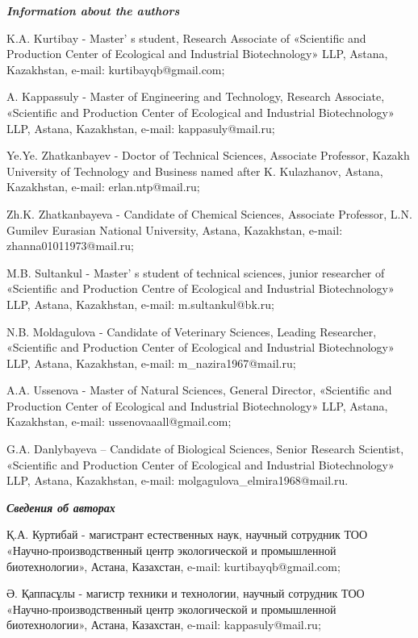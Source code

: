 \begin{authorinfo}
\hspace{1em}\emph{{\bfseries Information about the authors}}

K.A. Kurtibay - Master' s student, Research Associate of
«Scientific and Production Center of Ecological and Industrial
Biotechnology» LLP, Astana, Kazakhstan, e-mail: kurtibayqb@gmail.com;

A. Kappassuly - Master of Engineering and Technology, Research
Associate, «Scientific and Production Center of Ecological and
Industrial Biotechnology» LLP, Astana, Kazakhstan, e-mail:
kappasuly@mail.ru;

Ye.Ye. Zhatkanbayev - Doctor of Technical Sciences, Associate Professor,
Kazakh University of Technology and Business named after K. Kulazhanov,
Astana, Kazakhstan, e-mail: erlan.ntp@mail.ru;

Zh.K. Zhatkanbayeva - Candidate of Chemical Sciences, Associate
Professor, L.N. Gumilev Eurasian National University, Astana,
Kazakhstan, e-mail: zhanna01011973@mail.ru;

M.B. Sultankul - Master' s student of technical sciences,
junior researcher of «Scientific and Production Centre of Ecological and
Industrial Biotechnology» LLP, Astana, Kazakhstan, e-mail:
m.sultankul@bk.ru;

N.B. Moldagulova - Candidate of Veterinary Sciences, Leading Researcher,
«Scientific and Production Center of Ecological and Industrial
Biotechnology» LLP, Astana, Kazakhstan, e-mail: m\_nazira1967@mail.ru;

A.A. Ussenova - Master of Natural Sciences, General Director,
«Scientific and Production Center of Ecological and Industrial
Biotechnology» LLP, Astana, Kazakhstan, e-mail: ussenovaaall@gmail.com;

G.A. Danlybayeva -- Candidate of Biological Sciences, Senior Research
Scientist, «Scientific and Production Center of Ecological and
Industrial Biotechnology» LLP, Astana, Kazakhstan, e-mail:
molgagulova\_elmira1968@mail.ru.

\hspace{1em}\emph{{\bfseries Сведения об авторах}}

Қ.А. Куртибай - магистрант естественных наук, научный сотрудник ТОО
«Научно-производственный центр экологической и промышленной
биотехнологии», Астана, Казахстан, e-mail: kurtibayqb@gmail.com;

Ә. Қаппасұлы - магистр техники и технологии, научный сотрудник ТОО
«Научно-производственный центр экологической и промышленной
биотехнологии», Астана, Казахстан, e-mail: kappasuly@mail.ru;


\end{authorinfo}
